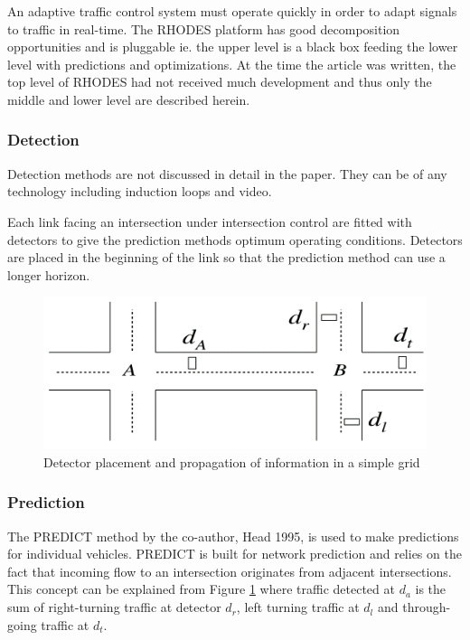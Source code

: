 An adaptive traffic control system must operate quickly in order to adapt signals to traffic in real-time. The RHODES platform has good decomposition opportunities and is pluggable ie. the upper level is a black box feeding the lower level with predictions and optimizations. At the time the article was written, the top level of RHODES had not received much development and thus only the middle and lower level are described herein.

\subsubsection*{Detection}
Detection methods are not discussed in detail in the paper. They can be of any technology including induction loops and video. 

Each link facing an intersection under intersection control are fitted with detectors to give the prediction methods optimum operating conditions. Detectors are placed in the beginning of the link so that the prediction method can use a longer horizon.

\begin{figure}[!ht]
\begin{center}
\includegraphics[scale=0.5]{rhodes_prediction-strategy.png} 
\end{center}
\caption{Detector placement and propagation of information in a simple grid}
\label{fig:rhodes_predict}
\end{figure}

\subsubsection*{Prediction}
The PREDICT method by the co-author, Head 1995, is used to make predictions for individual vehicles. PREDICT is built for network prediction and relies on the fact that incoming flow to an intersection originates from adjacent intersections. This concept can be explained from Figure \ref{fig:rhodes_predict} where traffic detected at $d_a$ is the sum of right-turning traffic at detector $d_r$, left turning traffic at $d_l$ and through-going traffic at $d_t$.

